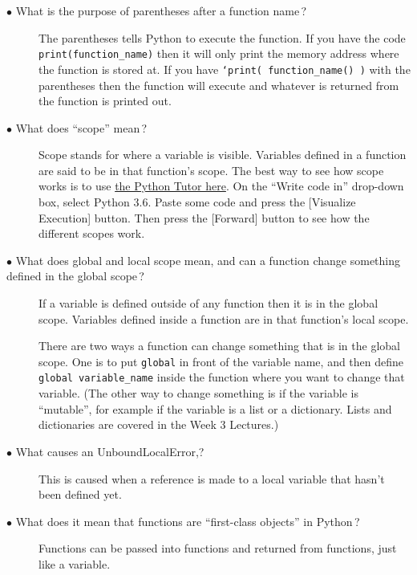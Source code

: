 \documentclass{article}
\newcommand{\inlinecode}[1]{\texttt{#1}}
\newcommand{\link}[2]{\textcolor{blue}{\href{#2}{#1}}}
\newcommand{\question}[1]{\item[$\bullet$ #1] \hfil}
\newenvironment{answer}{\newline}{}
\newenvironment{faq}{\begin{description}}{\end{description}}
\begin{document}
\begin{faq}
		\question{What is the purpose of parentheses after a function name\,?}
		\begin{answer}
			The parentheses tells Python to execute the function.  If you have the code \inlinecode{print(function\_name)} then it will only print the memory address where the function is stored at.  If you have \inlinecode{`print( function\_name() )} with the parentheses then the function will execute and whatever is returned from the function is printed out.
		\end{answer}
		
		\question{What does ``scope'' mean\,?}
		\begin{answer}
			Scope stands for where a variable is visible.  Variables defined in a function are said to be in that function's scope.  The best way to see how scope works is to use \link{the Python Tutor here}{http://www.pythontutor.com/visualize.html\#mode=edit}.  On the ``Write code in'' drop-down box, select Python 3.6.  Paste some code and press the [Visualize Execution] button.  Then press the [Forward] button to see how the different scopes work.
		\end{answer}
		
		\question{What does global and local scope mean, and can a function change something defined in the global scope\,?}
		\begin{answer}
			If a variable is defined outside of any function then it is in the global scope.  Variables defined inside a function are in that function's local scope.  
			
			There are two ways a function can change something that is in the global scope.  One is to put \inlinecode{global} in front of the variable name, and then define \inlinecode{global variable\_name} inside the function where you want to change that variable.  (The other way to change something is if the variable is ``mutable'', for example if the variable is a list or a dictionary.  Lists and dictionaries are covered in the Week 3 Lectures.)
		\end{answer}
		
		\question{What causes an UnboundLocalError,?}
		\begin{answer}
			This is caused when a reference is made to a local variable that hasn't been defined yet.
		\end{answer}
		
		\question{What does it mean that functions are ``first-class objects'' in Python\,?}
		\begin{answer}
			Functions can be passed into functions and returned from functions, just like a variable.
		\end{answer}
		

\end{faq}
\end{document}
